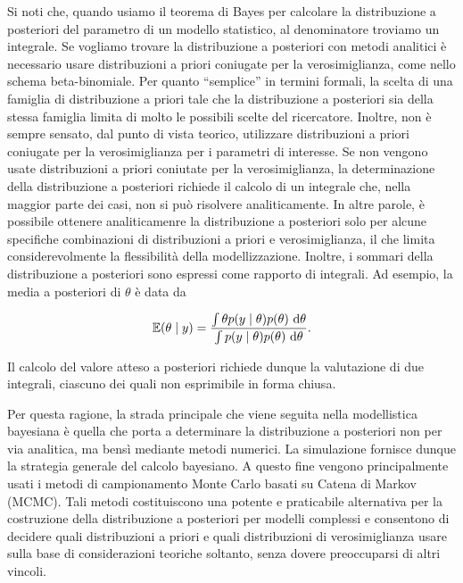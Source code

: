 \documentclass[
  11pt,
]{krantz}
\theoremstyle{definition}
\theoremstyle{definition}
\theoremstyle{definition}
\theoremstyle{definition}
\theoremstyle{remark}
\begin{document}
Si noti che, quando usiamo il teorema di Bayes per calcolare la distribuzione a posteriori del parametro di un modello statistico, al denominatore troviamo un integrale. Se vogliamo trovare la distribuzione a posteriori con metodi analitici è necessario usare distribuzioni a priori coniugate per la verosimiglianza, come nello schema beta-binomiale. Per quanto ``semplice'' in termini formali, la scelta di una famiglia di distribuzione a priori tale che la distribuzione a posteriori sia della stessa famiglia limita di molto le possibili scelte del ricercatore. Inoltre, non è sempre sensato, dal punto di vista teorico, utilizzare distribuzioni a priori coniugate per la verosimiglianza per i parametri di interesse. Se non vengono usate distribuzioni a priori coniutate per la verosimiglianza, la determinazione della distribuzione a posteriori richiede il calcolo di un integrale che, nella maggior parte dei casi, non si può risolvere analiticamente. In altre parole, è possibile ottenere analiticamenre la distribuzione a posteriori solo per alcune specifiche combinazioni di distribuzioni a priori e verosimiglianza, il che limita considerevolmente la flessibilità della modellizzazione. Inoltre, i sommari della distribuzione a posteriori sono espressi come rapporto di integrali. Ad esempio, la media a posteriori di \(\theta\) è data da

\begin{equation}
\mathbb{E}(\theta \mid y) = \frac{\int \theta p(y \mid \theta) p(\theta) \,\operatorname {d}\! \theta}{\int p(y \mid \theta) p(\theta) \,\operatorname {d}\! \theta}.\notag
\end{equation}

Il calcolo del valore atteso a posteriori richiede dunque la valutazione di due integrali, ciascuno dei quali non esprimibile in forma chiusa.

Per questa ragione, la strada principale che viene seguita nella modellistica bayesiana è quella che porta a determinare la distribuzione a posteriori non per via analitica, ma bensì mediante metodi numerici. La simulazione fornisce dunque la strategia generale del calcolo bayesiano. A questo fine vengono principalmente usati i metodi di campionamento Monte Carlo basati su Catena di Markov (MCMC). Tali metodi costituiscono una potente e praticabile alternativa per la costruzione della distribuzione a posteriori per modelli complessi e consentono di decidere quali distribuzioni a priori e quali distribuzioni di verosimiglianza usare sulla base di considerazioni teoriche soltanto, senza dovere preoccuparsi di altri vincoli.
\end{document}
